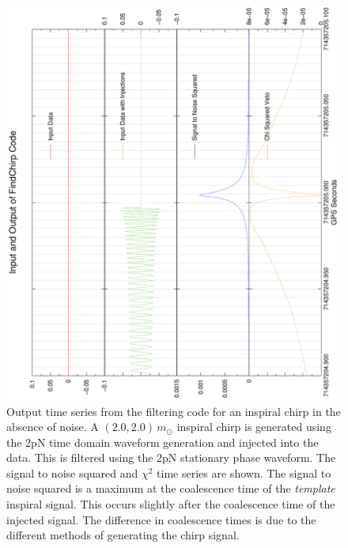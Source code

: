 \begin{figure}[htb]
\begin{center}
\includegraphics[angle=-90,width=0.75\linewidth]{figures/findchirp/zero_inject_zoom}
\end{center}
\caption{\label{f:zero_inject_zoom}Output time series from the filtering code
for an inspiral chirp in the absence of noise. A $(2.0,2.0)\,m_\odot$ inspiral
chirp is generated using the 2pN time domain waveform generation and injected
into the data. This is filtered using the 2pN stationary phase waveform. The
signal to noise squared and $\chi^2$ time series are shown.  The signal to
noise squared is a maximum at the coalescence time of the \textit{template}
inspiral signal. This occurs slightly after the coalescence time of the
injected signal. The difference in coalescence times is due to the different
methods of generating the chirp signal.
}
\end{figure}

